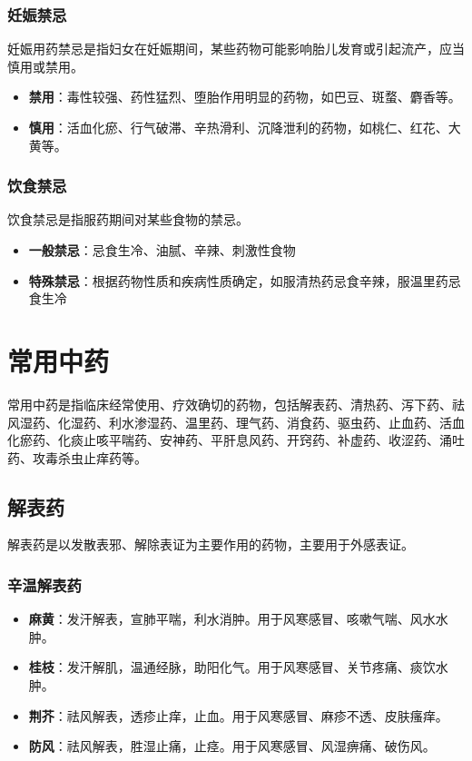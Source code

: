 \documentclass[12pt,UTF8]{ctexbook}
\begin{document}
\subsubsection{妊娠禁忌}

妊娠用药禁忌是指妇女在妊娠期间，某些药物可能影响胎儿发育或引起流产，应当慎用或禁用。

\begin{itemize}
\item \textbf{禁用}：毒性较强、药性猛烈、堕胎作用明显的药物，如巴豆、斑蝥、麝香等。
\item \textbf{慎用}：活血化瘀、行气破滞、辛热滑利、沉降泄利的药物，如桃仁、红花、大黄等。
\end{itemize}

\subsubsection{饮食禁忌}

饮食禁忌是指服药期间对某些食物的禁忌。

\begin{itemize}
\item \textbf{一般禁忌}：忌食生冷、油腻、辛辣、刺激性食物
\item \textbf{特殊禁忌}：根据药物性质和疾病性质确定，如服清热药忌食辛辣，服温里药忌食生冷
\end{itemize}

\section{常用中药}

常用中药是指临床经常使用、疗效确切的药物，包括解表药、清热药、泻下药、祛风湿药、化湿药、利水渗湿药、温里药、理气药、消食药、驱虫药、止血药、活血化瘀药、化痰止咳平喘药、安神药、平肝息风药、开窍药、补虚药、收涩药、涌吐药、攻毒杀虫止痒药等。

\subsection{解表药}

解表药是以发散表邪、解除表证为主要作用的药物，主要用于外感表证。

\subsubsection{辛温解表药}

\begin{itemize}
\item \textbf{麻黄}：发汗解表，宣肺平喘，利水消肿。用于风寒感冒、咳嗽气喘、风水水肿。
\item \textbf{桂枝}：发汗解肌，温通经脉，助阳化气。用于风寒感冒、关节疼痛、痰饮水肿。
\item \textbf{荆芥}：祛风解表，透疹止痒，止血。用于风寒感冒、麻疹不透、皮肤瘙痒。
\item \textbf{防风}：祛风解表，胜湿止痛，止痉。用于风寒感冒、风湿痹痛、破伤风。
\end{itemize}
\end{document}
